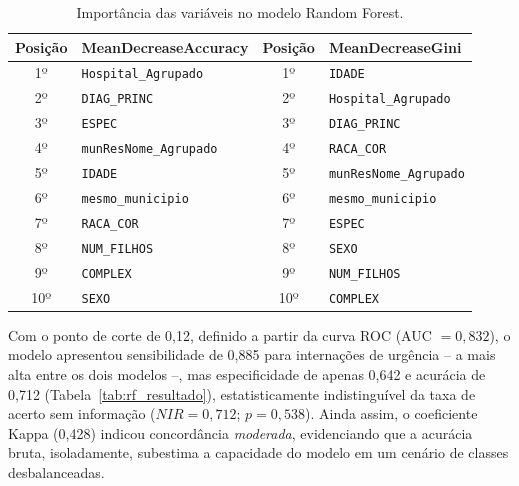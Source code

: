\documentclass[12pt,a4paper]{article}
\begin{document}
\begin{table}[H]
\centering
\caption{Importância das variáveis no modelo Random Forest.}
\label{tab:importancia}
\begin{tabular}{clcl}
\toprule
Posição & MeanDecreaseAccuracy & Posição & MeanDecreaseGini \\
\midrule
1º & \texttt{Hospital\_Agrupado} & 1º & \texttt{IDADE} \\
2º & \texttt{DIAG\_PRINC} & 2º & \texttt{Hospital\_Agrupado} \\
3º & \texttt{ESPEC} & 3º & \texttt{DIAG\_PRINC} \\
4º & \texttt{munResNome\_Agrupado} & 4º & \texttt{RACA\_COR} \\
5º & \texttt{IDADE} & 5º & \texttt{munResNome\_Agrupado} \\
6º & \texttt{mesmo\_municipio} & 6º & \texttt{mesmo\_municipio} \\
7º & \texttt{RACA\_COR} & 7º & \texttt{ESPEC} \\
8º & \texttt{NUM\_FILHOS} & 8º & \texttt{SEXO} \\
9º & \texttt{COMPLEX} & 9º & \texttt{NUM\_FILHOS} \\
10º & \texttt{SEXO} & 10º & \texttt{COMPLEX} \\
\bottomrule
\end{tabular}
\end{table}

Com o ponto de corte de 0,12, definido a partir da curva ROC (AUC $=0,832$), o modelo apresentou sensibilidade de 0,885 para internações de urgência -- a mais alta entre os dois modelos --, mas especificidade de apenas 0,642 e acurácia de 0,712 (Tabela~\ref{tab:rf_resultado}), estatisticamente indistinguível da taxa de acerto sem informação ($NIR=0,712$; $p=0,538$). Ainda assim, o coeficiente Kappa (0,428) indicou concordância \emph{moderada}, evidenciando que a acurácia bruta, isoladamente, subestima a capacidade do modelo em um cenário de classes desbalanceadas.
\end{document}

